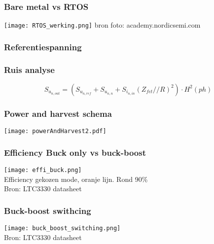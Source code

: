 \begin{frame}
    \frametitle{Bare metal vs RTOS}
    \texttt{[image: RTOS\_werking.png]}
    bron foto: academy.nordicsemi.com
\end{frame}




\begin{frame}
    \frametitle{Referentiespanning}
    


\end{frame}


\begin{frame}
    \frametitle{Ruis analyse}

    \begin{figure}
        \centering
        \def\svgwidth{0.7\textwidth}
        
    \end{figure}
    \begin{equation*}\label{eq:measureNoiseOut}
        S_{u_{{n,out}}} = \left(S_{u_{{n,ref}}} + S_{u_{{n,n}}} + S_{i_{{n,in}}}\left(Z_{fet} // R\right)^2\right) \cdot H^2(ph)
    \end{equation*}

\end{frame}

\begin{frame}
    \frametitle{Power and harvest schema}
    \centering
    \texttt{[image: powerAndHarvest2.pdf]}
\end{frame}

\begin{frame}
    \frametitle{Efficiency Buck only vs buck-boost}
    \centering
    \texttt{[image: effi\_buck.png]}\\
    Efficiency gekozen mode, oranje lijn. Rond 90\%\\
    Bron: LTC3330 datasheet
\end{frame}

\begin{frame}
    \frametitle{Buck-boost swithcing}
    \centering
    \texttt{[image: buck\_boost\_switching.png]}\\
    Bron: LTC3330 datasheet
\end{frame}

